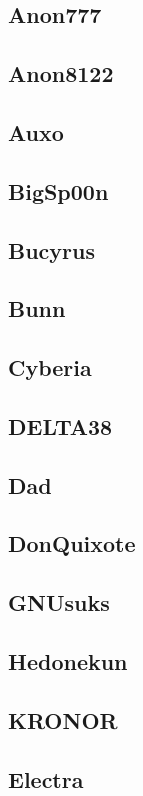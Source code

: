 \documentclass[12pt]{report}
\begin{document}
{{        \subsection{Anon777}
        \subsection{Anon8122}
        \subsection{Auxo}
        \subsection{BigSp00n}
        \subsection{Bucyrus}
        \subsection{Bunn}
        \subsection{Cyberia}
        \subsection{DELTA38}
        \subsection{Dad}
        \subsection{DonQuixote}
        \subsection{GNUsuks}
        \subsection{Hedonekun}
        \subsection{KRONOR}
        \subsection{Electra}
}}
\end{document}
